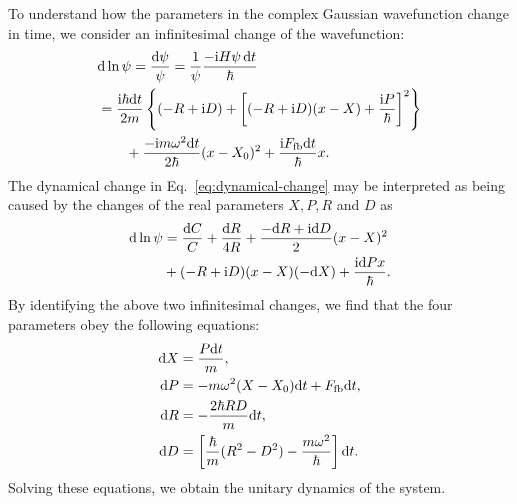 \documentclass[aps,pra,superscriptaddress,twocolumn
]{revtex4-2}
\renewcommand{\i}{\mathrm{i}}
\renewcommand{\d}{{\rm d}}
\begin{document}
 
 To understand how the parameters in the complex Gaussian wavefunction change in time, 
 we consider an infinitesimal change of the wavefunction:
 \begin{alignat}{1}
   &\d \ln \psi = \frac{\d \psi}{\psi}= \frac{1}{\psi} \frac{-\i H \psi\, \d t}{\hbar} \notag \\
   &= \frac{\i \hbar \d t}{2m} \left\{(-R + \i D) + \left[(-R + \i D)(x-X) + \frac{\i P}{\hbar}\right]^2\right\} \notag \\
   &\qquad + \frac{-\i m\omega^2 \d t}{2\hbar} (x-X_0)^2 + \frac{\i F_{\rm fb} \d t}{\hbar} x. \label{eq:dynamical-change}
 \end{alignat}
 The dynamical change in Eq.~\eqref{eq:dynamical-change} may be interpreted as being caused
 by the changes of the real parameters $X, P, R$ and $D$ as 
 \begin{alignat}{1}
  \d \ln \psi &= \frac{\d C}{C} + \frac{\d R}{4R} 
  + \frac{-\d R + \i \d D}{2}(x-X)^2 \notag \\
  & + (-R + \i D)(x-X)(-\d X) + \frac{\i \d P x}{\hbar}.
 \end{alignat}
 By identifying the above two infinitesimal changes, 
 we find that the four parameters obey the following equations:
 \begin{alignat}{1}
  \d X &= \frac{P \d t}{m}, \\
  \d P &= - m\omega^2 (X - X_0) \d t + F_{\rm fb} \d t, \\
  \d R &= -\frac{2\hbar RD}{m}\d t, \\
  \d D &= \left[\frac{\hbar}{m}(R^2 - D^2) - \frac{m\omega^2}{\hbar}\right]\d t.
 \end{alignat}
 Solving these equations, we obtain the unitary dynamics of the system.
 
\end{document}
